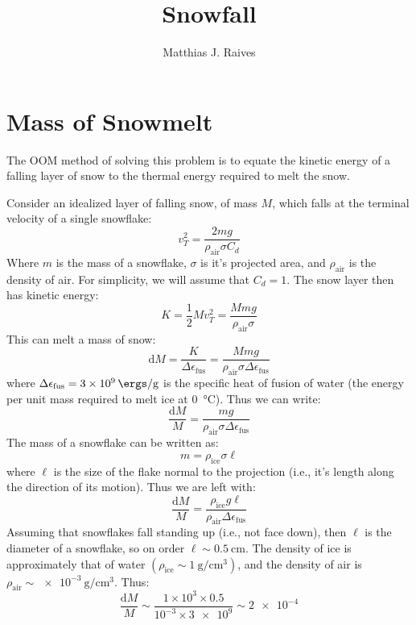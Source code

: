 \documentclass{article}
\title{Snowfall}
\author{Matthias J. Raives}
\begin{document}
    
    \maketitle{}
    
    \section{Mass of Snowmelt}
    The OOM method of solving this problem is to equate the kinetic energy of a falling layer of snow to the thermal energy required to melt the snow.
    
    Consider an idealized layer of falling snow, of mass $M$, which falls at the terminal velocity of a single snowflake:
    \begin{equation}
        v_{T}^{2} = \frac{2mg}{\rho_\mathrm{air} \sigma C_{d}}
    \end{equation}
    Where $m$ is the mass of a snowflake, $\sigma$ is it's projected area, and $\rho_\mathrm{air}$ is the density of air. For simplicity, we will assume that $C_{d}=1$.  The snow layer then has kinetic energy:
    \begin{equation}
        K = \frac{1}{2}Mv_{T}^{2} = \frac{Mmg}{\rho_\mathrm{air}\sigma}
    \end{equation}
    This can melt a mass of snow:
    \begin{equation}
        \mathrm{d}M = \frac{K}{\Delta\epsilon_\mathrm{fus}} = \frac{Mmg}{\rho_\mathrm{air}\sigma\Delta\epsilon_\mathrm{fus}}
    \end{equation}
    where $\Delta\epsilon_\mathrm{fus}=\SI{3e9}{\ergs\per\gram}$ is the specific heat of fusion of water (the energy per unit mass required to melt ice at \SI{0}{\celsius}).  Thus we can write:
    \begin{equation}
        \frac{\mathrm{d}M}{M} = \frac{mg}{\rho_\mathrm{air}\sigma\Delta\epsilon_\mathrm{fus}}
    \end{equation}
    The mass of a snowflake can be written as:
    \begin{equation}
        m = \rho_\mathrm{ice}\sigma\ell
    \end{equation}
    where $\ell$ is the size of the flake normal to the projection (i.e., it's length along the direction of its motion).  Thus we are left with:
    \begin{equation}
        \frac{\mathrm{d}M}{M} = \frac{\rho_{\mathrm{ice}}g\ell}{\rho_\mathrm{air}\Delta\epsilon_{\mathrm{fus}}}\label{eq:dmM}
    \end{equation}
    Assuming that snowflakes fall standing up (i.e., not face down), then $\ell$ is the diameter of a snowflake, so on order $\ell\sim\SI{0.5}{\cm}$.  The density of ice is approximately that of water $(\rho_{\mathrm{ice}}\sim\SI{1}{\gram\per\cubic\cm})$, and the density of air is $\rho_{\mathrm{air}}\sim\SI{e-3}{\gram\per\cubic\cm}$.  Thus:
    \begin{equation}
        \frac{\mathrm{d}M}{M} \sim \frac{1\times10^{3}\times0.5}{10^{-3}\times\num{3e9}} \sim \num{2e-4}
    \end{equation}
    
\end{document}
